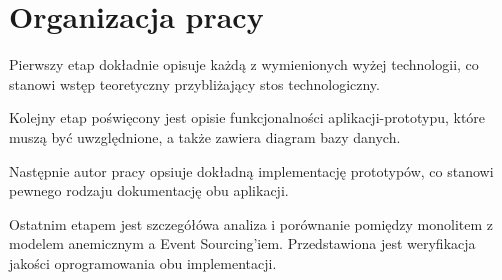 \section{Organizacja pracy}
Pierwszy etap dokładnie opisuje każdą z wymienionych wyżej technologii, co stanowi wstęp teoretyczny przybliżający stos technologiczny.

Kolejny etap poświęcony jest opisie funkcjonalności aplikacji-prototypu, które muszą być uwzględnione, a także zawiera diagram bazy danych.

Następnie autor pracy opsiuje dokładną implementację prototypów, co stanowi pewnego rodzaju dokumentację obu aplikacji.

Ostatnim etapem jest szczegółówa analiza i porównanie pomiędzy monolitem  z modelem anemicznym  a Event Sourcing'iem. Przedstawiona jest weryfikacja jakości oprogramowania obu implementacji. 



